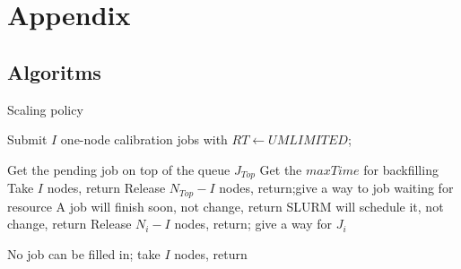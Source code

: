 
\chapter{Appendix} %



\ifpdf
    \graphicspath{{X/figures/PNG/}{X/figures/PDF/}{X/figures/}}
\else
    \graphicspath{{X/figures/EPS/}{X/figures/}}
\fi

% 
\section{Algoritms}
\makeatletter
\def\BState{\State\hskip-\ALG@thistlm}
\makeatother
\begin{algorithm}[htb]
    \caption{Scaling policy}\label{algo:scalingPolicy}
    \begin{algorithmic}[1]
        \State Submit $I$ one-node calibration jobs with $RT\gets UMLIMITED$;
        
      \Else 
         \State Get the pending job on top of the queue $J_{Top}$
         \State Get the $maxTime$ for backfilling
            \State Take $I$ nodes, return
         \EndIf
            \State Release $N_{Top}-I$ nodes, return;give a way to job waiting for resource
         \EndIf
            \State A job will finish soon, not change, return 
          \EndIf
         \EndFor
                    \State SLURM will schedule it, not change, return 
                \EndIf
                    \State Release $N_{i}-I$ nodes, return; give a way for $J_{i}$
                \EndIf
            \EndIf
         \EndFor

      \EndIf
      \State No job can be filled in; take $I$ nodes, return
      \EndProcedure
    \end{algorithmic}
  \end{algorithm}


